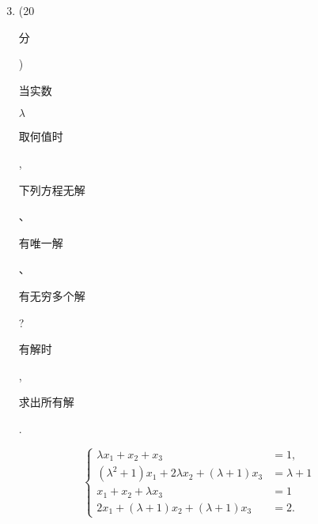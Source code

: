 \documentclass[10pt]{article}
\begin{document}
\begin{enumerate}
  \setcounter{enumi}{2}
  \item (20 \begin{CJK}{UTF8}{mj}分\end{CJK}) \begin{CJK}{UTF8}{mj}当实数\end{CJK} $\lambda$ \begin{CJK}{UTF8}{mj}取何值时\end{CJK}, \begin{CJK}{UTF8}{mj}下列方程无解\end{CJK}、\begin{CJK}{UTF8}{mj}有唯一解\end{CJK}、\begin{CJK}{UTF8}{mj}有无穷多个解\end{CJK}? \begin{CJK}{UTF8}{mj}有解时\end{CJK}, \begin{CJK}{UTF8}{mj}求出所有解\end{CJK}.
\end{enumerate}
$$
\begin{cases}\lambda x_{1}+x_{2}+x_{3} & =1, \\ \left(\lambda^{2}+1\right) x_{1}+2 \lambda x_{2}+(\lambda+1) x_{3} & =\lambda+1 \\ x_{1}+x_{2}+\lambda x_{3} & =1 \\ 2 x_{1}+(\lambda+1) x_{2}+(\lambda+1) x_{3} & =2 .\end{cases}
$$
\end{document}
